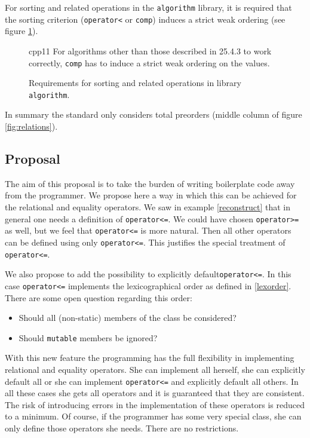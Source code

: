 ﻿\documentclass[a4paper,11pt,twoside,final]{article}
\newcommand{\tcode}[1]{\lstinline[basicstyle=\normalsize\ttfamily]{#1}}
\numberwithin{equation}{subsection}
\begin{document}
For sorting and related operations in the \verb|algorithm| library, it is required that the sorting criterion (\tcode{operator<} or \tcode{comp}) induces a strict weak ordering (see figure \ref{fig:algorithm}). 
\begin{figure}[h!]
\SetCiteCommand{\citetalias}
\begin{displaycquote}[][\S 25.4 p3]{cpp11}
\textelp{} For algorithms other than those described in 25.4.3 to work correctly, \texttt{comp} has to induce a strict weak ordering on the values.
\end{displaycquote}
\caption{Requirements for sorting and related operations in library \texttt{algorithm}.}
\label{fig:algorithm}
\end{figure}

In summary the standard only considers total preorders (middle column of figure \ref{fig:relations}).

\subsection{Proposal}
The aim of this proposal is to take the burden of writing boilerplate code away from the programmer. We propose here a way in which this can be achieved for the relational and equality operators. We saw in example \ref{reconstruct} that in general one needs a definition of \tcode{operator<=}. We could have chosen \tcode{operator>=} as well, but we feel that \tcode{operator<=} is more natural. Then all other operators can be defined using only \tcode{operator<=}. This justifies the special treatment of \tcode{operator<=}.\par

We also propose to add the possibility to explicitly default\tcode{operator<=}. In this case \tcode{operator<=} implements the lexicographical order as defined in \ref{lexorder}. There are some open question regarding this order:
\begin{itemize}
\item Should all (non-static) members of the class be considered?
\item Should \verb|mutable| members be ignored?
\end{itemize}

With this new feature the programming has the full flexibility in implementing relational and equality operators. She can implement all herself, she can explicitly default all or she can implement \tcode{operator<=} and explicitly default all others. In all these cases she gets all operators and it is guaranteed that they are consistent. The risk of introducing errors in the implementation of these operators is reduced to a minimum. Of course, if the programmer has some very special class, she can only define those operators she needs. There are no restrictions.\par
\end{document}
